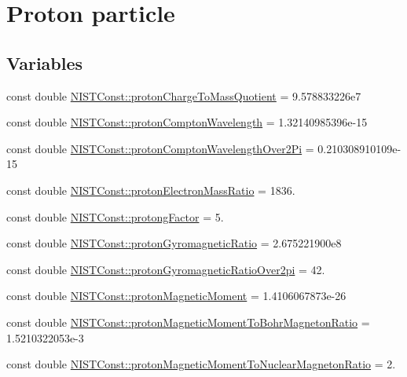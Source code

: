 \hypertarget{group___n_i_s_t_const-_proton}{}\section{Proton particle}
\label{group___n_i_s_t_const-_proton}
\subsection*{Variables}
\begin{DoxyCompactItemize}
\item 
const double \hyperlink{group___n_i_s_t_const-_proton_ga59d127bca4ef5416e0e42c4d05c35a68}{N\+I\+S\+T\+Const\+::proton\+Charge\+To\+Mass\+Quotient} = 9.\+578833226e7
\item 
const double \hyperlink{group___n_i_s_t_const-_proton_ga79247734bd6f7409a382e17da7359680}{N\+I\+S\+T\+Const\+::proton\+Compton\+Wavelength} = 1.\+32140985396e-\/15
\item 
const double \hyperlink{group___n_i_s_t_const-_proton_gaedddad375441d4bf1013089ba0004da5}{N\+I\+S\+T\+Const\+::proton\+Compton\+Wavelength\+Over2\+Pi} = 0.\+210308910109e-\/15
\item 
const double \hyperlink{group___n_i_s_t_const-_proton_gae88fb4c421a252321d15b0f93ad19954}{N\+I\+S\+T\+Const\+::proton\+Electron\+Mass\+Ratio} = 1836.
\item 
const double \hyperlink{group___n_i_s_t_const-_proton_gafdc26fffabee1319028bd7f61d561be5}{N\+I\+S\+T\+Const\+::protong\+Factor} = 5.
\item 
const double \hyperlink{group___n_i_s_t_const-_proton_ga5e708f58aaae8033705f05bc13507873}{N\+I\+S\+T\+Const\+::proton\+Gyromagnetic\+Ratio} = 2.\+675221900e8
\item 
const double \hyperlink{group___n_i_s_t_const-_proton_ga54ecf0d1090a1b2c9f7b301add8904b0}{N\+I\+S\+T\+Const\+::proton\+Gyromagnetic\+Ratio\+Over2pi} = 42.
\item 
const double \hyperlink{group___n_i_s_t_const-_proton_ga931c9d53a62cee8eb68b4e930d0cf5a6}{N\+I\+S\+T\+Const\+::proton\+Magnetic\+Moment} = 1.\+4106067873e-\/26
\item 
const double \hyperlink{group___n_i_s_t_const-_proton_gab71f8e2de250b48e9bbac602b69999de}{N\+I\+S\+T\+Const\+::proton\+Magnetic\+Moment\+To\+Bohr\+Magneton\+Ratio} = 1.\+5210322053e-\/3
\item 
const double \hyperlink{group___n_i_s_t_const-_proton_gae8cd4187eb7069a37639787bf4b1305a}{N\+I\+S\+T\+Const\+::proton\+Magnetic\+Moment\+To\+Nuclear\+Magneton\+Ratio} = 2.

\end{DoxyCompactItemize}
